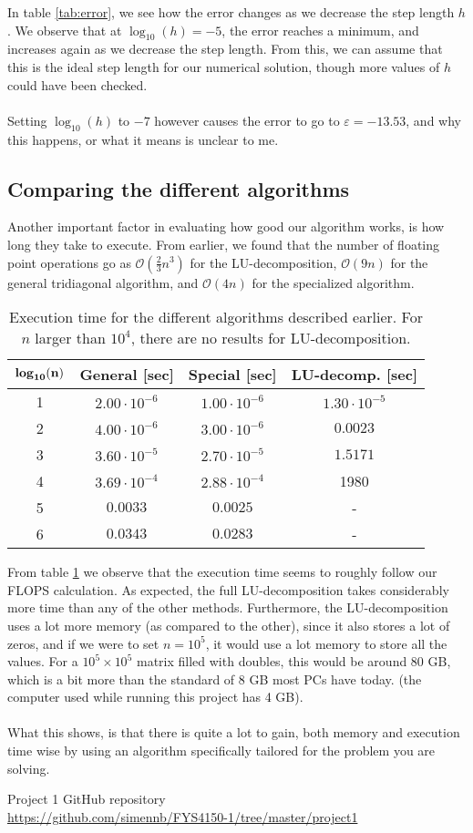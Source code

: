 \documentclass{article}
\begin{document}
In table \ref{tab:error}, we see how the error changes as we decrease the step length $h$. We observe that at $\log_{10}(h) = -5$, the error reaches a minimum, and increases again as we decrease the step length. From this, we can assume that this is the ideal step length for our numerical solution, though more values of $h$ could have been checked.\\\\
Setting $\log_{10}(h) $ to $-7$ however causes the error to go to $\varepsilon = -13.53$, and why this happens, or what it means is unclear to me.

\subsection{Comparing the different algorithms}
Another important factor in evaluating how good our algorithm works, is how long they take to execute. From earlier, we found that the number of floating point operations go as $\mathcal{O}(\tfrac{2}{3}n^3)$ for the LU-decomposition, $\mathcal{O}(9n)$ for the general tridiagonal algorithm, and $\mathcal{O}(4n)$ for the specialized algorithm.
\begin{table}[H]
  \centering
  \caption{Execution time for the different algorithms described earlier. For $n$ larger than $10^4$, there are no results for LU-decomposition.}
  \begin{tabular}{|c|c|c|c|}
    \hline
    $\mathbf{\text{\textbf{log}}_{10}(n)}$&\textbf{General [sec]}&\textbf{Special [sec]}&\textbf{LU-decomp. [sec]}\\\hline
    1&$2.00\cdot10^{-6}$&$1.00\cdot10^{-6}$&$1.30\cdot10^{-5}$\\\hline
    2&$4.00\cdot10^{-6}$&$3.00\cdot10^{-6}$&$0.0023$\\\hline
    3&$3.60\cdot10^{-5}$&$2.70\cdot10^{-5}$&$1.5171$\\\hline
    4&$3.69\cdot10^{-4}$&$2.88\cdot10^{-4}$&1980\\\hline
    5&$0.0033$&$0.0025$&-\\\hline
    6&$0.0343$&$0.0283$&-\\\hline
  \end{tabular}
  \label{tab:time}
\end{table}
From table \ref{tab:time} we observe that the execution time seems to roughly follow our FLOPS calculation. As expected, the full LU-decomposition takes considerably more time than any of the other methods. Furthermore, the LU-decomposition uses a lot more memory (as compared to the other), since it also stores a lot of zeros, and if we were to set $n = 10^5$, it would use a lot memory to store all the values. For a $10^5\times10^5$ matrix filled with doubles, this would be around 80 GB, which is a bit more than the standard of 8 GB most PCs have today. (the computer used while running this project has 4 GB).\\\\
What this shows, is that there is quite a lot to gain, both memory and execution time wise by using an algorithm specifically tailored for the problem you are solving. 

\begin{thebibliography}{40}
  Project 1 GitHub repository\\\href{https://github.com/simennb/FYS4150-1/tree/master/project1}{https://github.com/simennb/FYS4150-1/tree/master/project1}
\end{thebibliography}
\end{document}
